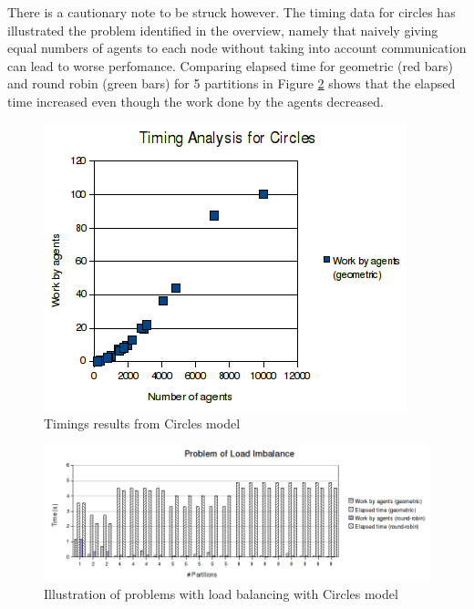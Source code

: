 There is a cautionary note to be struck however. The timing data for circles has illustrated the problem identified in the overview, namely that naively giving equal numbers of agents to each node without taking into account communication can lead to worse perfomance. Comparing elapsed time for geometric (red bars) and round robin (green bars) for 5 partitions in Figure \ref{fig:timings_problems} shows that the elapsed time increased even though the work done by the agents decreased.

\begin{figure}[h]
 \centering
  \includegraphics[scale=0.75]{circles-timings.png}
 \caption{Timings results from Circles model}
 \label{fig:circle_timings}
\end{figure}

\begin{figure}[h]
  \hspace{-10mm}
  \includegraphics[scale=0.6]{timings-problems.png}
 \caption{Illustration of problems with load balancing with Circles model}
 \label{fig:timings_problems}
\end{figure}

